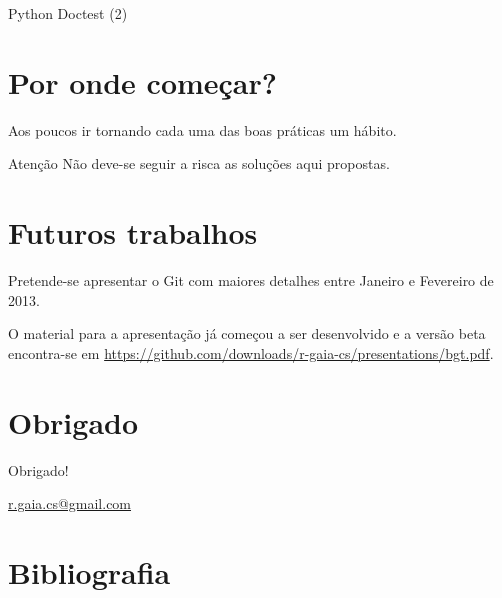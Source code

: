 \documentclass[11pt]{beamer}
\begin{document}
\begin{frame}[fragile]{Python Doctest (2)}
    \begin{example}[Continuação]
        
    \end{example}
\end{frame}

\section{Por onde começar?}
\begin{frame}
    Aos poucos ir tornando cada uma das boas práticas um hábito.
    \begin{block}{Atenção}
        Não deve-se seguir a risca as soluções aqui propostas.
    \end{block}
\end{frame}

\section{Futuros trabalhos}
\begin{frame}
    Pretende-se apresentar o Git com maiores detalhes entre Janeiro e Fevereiro
    de 2013.

    O material para a apresentação já começou a ser desenvolvido e a versão
    beta encontra-se em
    \url{https://github.com/downloads/r-gaia-cs/presentations/bgt.pdf}.
\end{frame}

\section*{Obrigado}
\begin{frame}
    \begin{center}
        Obrigado!
    \end{center}
    \begin{center}
        \url{r.gaia.cs@gmail.com}
    \end{center}
\end{frame}

\section*{Bibliografia}
\begin{frame}
    
    
\end{frame}
\end{document}

